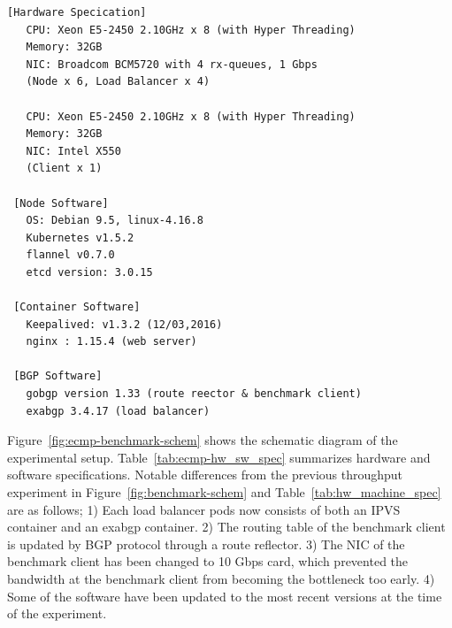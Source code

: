 \begin{table}[h]
  \centering
  \begin{minipage}{0.9\columnwidth}
    \begin{lstlisting}[frame=lines,breaklines=true,basicstyle=\small\ttfamily]
 [Hardware Specication]
   CPU: Xeon E5-2450 2.10GHz x 8 (with Hyper Threading)
   Memory: 32GB
   NIC: Broadcom BCM5720 with 4 rx-queues, 1 Gbps
   (Node x 6, Load Balancer x 4)

   CPU: Xeon E5-2450 2.10GHz x 8 (with Hyper Threading)
   Memory: 32GB
   NIC: Intel X550
   (Client x 1)

 [Node Software]
   OS: Debian 9.5, linux-4.16.8
   Kubernetes v1.5.2
   flannel v0.7.0
   etcd version: 3.0.15

 [Container Software]
   Keepalived: v1.3.2 (12/03,2016)
   nginx : 1.15.4 (web server)

 [BGP Software]
   gobgp version 1.33 (route reector & benchmark client)
   exabgp 3.4.17 (load balancer)
    \end{lstlisting}
  \end{minipage}

  \par\bigskip
  \centering
  \begin{minipage}{0.9\columnwidth}
    \caption[Hardware and software specifications for ECMP experiment]{
      Hardware and software specifications for ECMP experiment.
      The NIC of the benchmark client is 10 Gbps card to measure the aggregated throughput of 1Gbps load balancers.
    }
    \label{tab:ecmp-hw_sw_spec}
  \end{minipage}
\end{table}

Figure~\ref{fig:ecmp-benchmark-schem} shows the schematic diagram of the experimental setup. Table~\ref{tab:ecmp-hw_sw_spec} summarizes hardware and software specifications.
Notable differences from the previous throughput experiment in Figure~\ref{fig:benchmark-schem} and Table~\ref{tab:hw_machine_spec} are as follows;
1) Each load balancer pods now consists of both an IPVS container and an exabgp container.
2) The routing table of the benchmark client is updated by BGP protocol through a route reflector.
3) The NIC of the benchmark client has been changed to 10 Gbps card, which prevented the bandwidth at the benchmark client from becoming the bottleneck too early.
4) Some of the software have been updated to the most recent versions at the time of the experiment.

\FloatBarrier

